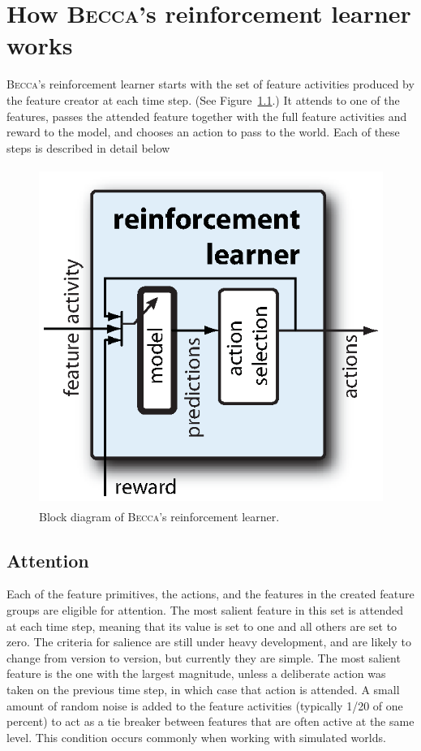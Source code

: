 \chapter{How \textsc{Becca}'s reinforcement learner works}
\label{learner_chapter}


\textsc{Becca}'s reinforcement learner starts with the set of feature activities produced by the feature creator at each time step. (See Figure~\ref{becca_reinforcement_learner}.) It attends to one of the features, passes the attended feature together with the full feature activities and reward to the model, and chooses an action to pass to the world. Each of these steps is described in detail below  

\begin{figure}
\centering
\includegraphics[height=11cm]{figs/becca_reinforcement_learner.eps}
\caption{Block diagram of \textsc{Becca}'s reinforcement learner.}
\label{becca_reinforcement_learner}
\end{figure}

\section{Attention}
Each of the feature primitives, the actions, and the features in the created feature groups are eligible for attention. The most salient feature in this set is attended at each time step, meaning that its value is set to one and all others are set to zero. The criteria for salience are still under heavy development, and are likely to change from version to version, but currently they are simple. The most salient feature is the one with the largest magnitude, unless a deliberate action was taken on the previous time step, in which case that action is attended. A small amount of random noise is added to the feature activities (typically 1/20 of one percent) to act as a tie breaker between features that are often active at the same level. This condition occurs commonly when working with simulated worlds.

